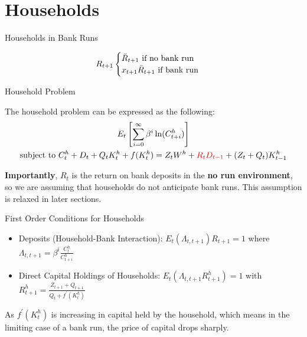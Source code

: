 \documentclass[
	11pt, %
	aspectratio=169, %
]{beamer}
\begin{document}
\section{Households}
\begin{frame}{Households in Bank Runs}
    \begin{definition}
        \begin{equation}
        R_{t+1}
        \begin{cases}
            \Bar{R}_{t+1} \text{ if no bank run }\\
            x_{t+1} \Bar{R}_{t+1} \text{ if bank run }
        \end{cases}
    \end{equation}
    \end{definition}
\end{frame}
\begin{frame}{Household Problem}
    \begin{Definition}
        The household problem can be expressed as the following: 
        \begin{multline}
                E_{t}\left[\sum^\infty_{i=0}\beta^i\ln(C_{t+i}^h)\right]\\
                \text{subject to } C_t^h+D_t+Q_t K_t^h + f(K_t^h) = Z_t W^h + \textcolor{red}{R_t D_{t-1}} + (Z_t +Q_t)K_{t-1}^h
        \end{multline}
    \end{Definition}
    \bigbreak
    \textbf{Importantly}, $R_t$ is the return on bank deposits in the \textbf{no run environment}, so we are assuming that 
    households do not anticipate bank runs. This assumption is relaxed in later sections.
\end{frame}
\begin{frame}{First Order Conditions for Households}
    \begin{itemize}
        \item Deposits (Household-Bank Interaction): $E_t(\Lambda_{t,t+1})R_{t+1}=1$ where $\Lambda_{t,t+1}=\beta^i\frac{C_t^h}{C_{t+i}^h}$
        \item Direct Capital Holdings of Households: $E_t(\Lambda_{t,t+1}R_{t+1}^h)=1$ with $R_{t+1}^h=\frac{Z_{t+1}+Q_{t+1}}{Q_t+f^\prime(K_t^h)}$
    \end{itemize}
    \bigbreak
    As $f^\prime(K_t^h)$ is increasing in capital held by the household, which means
    in the limiting case of a bank run, the price of capital drops sharply.
\end{frame}
\end{document}
